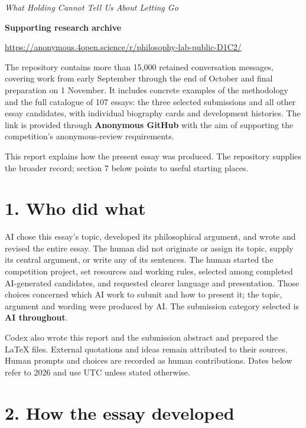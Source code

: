 
\emph{What Holding Cannot Tell Us About Letting Go}

\noindent\colorbox{black!4}{\begin{minipage}{\dimexpr\linewidth-2\fboxsep\relax}
{\bfseries Supporting research archive}\par\smallskip

\url{https://anonymous.4open.science/r/philosophy-lab-public-D1C2/}

The repository contains more than 15,000 retained conversation messages, covering work from early September through the end of October and final preparation on 1 November. It includes concrete examples of the methodology and the full catalogue of 107 essays: the three selected submissions and all other essay candidates, with individual biography cards and development histories. The link is provided through \textbf{Anonymous GitHub} with the aim of supporting the competition's anonymous-review requirements.

This report explains how the present essay was produced. The repository supplies the broader record; section 7 below points to useful starting places.

\end{minipage}}\par\medskip
\section*{1. Who did what}

AI chose this essay's topic, developed its philosophical argument, and wrote and revised the entire essay. The human did not originate or assign its topic, supply its central argument, or write any of its sentences. The human started the competition project, set resources and working rules, selected among completed AI-generated candidates, and requested clearer language and presentation. Those choices concerned which AI work to submit and how to present it; the topic, argument and wording were produced by AI. The submission category selected is \textbf{AI throughout}.

Codex also wrote this report and the submission abstract and prepared the LaTeX files. External quotations and ideas remain attributed to their sources. Human prompts and choices are recorded as human contributions. Dates below refer to 2026 and use UTC unless stated otherwise.

\section*{2. How the essay developed}

